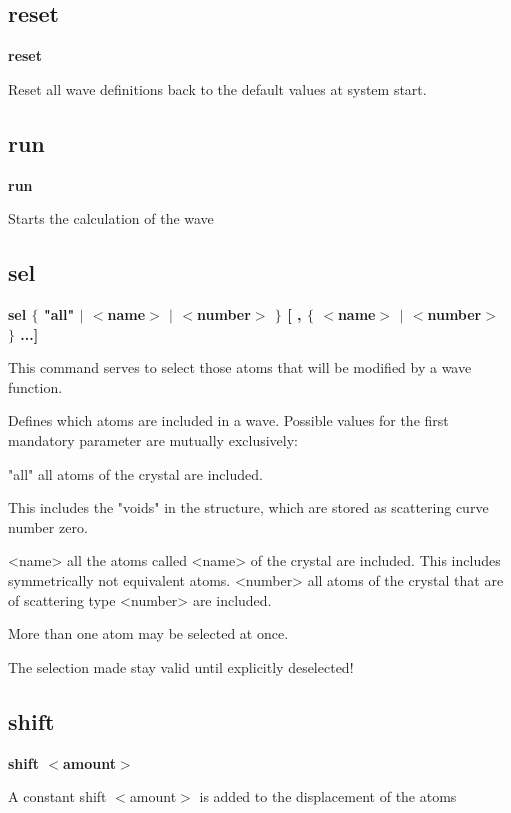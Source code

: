 \subsection*{reset}
{\bf reset \par }
\par
\vspace{3pt}
Reset all wave definitions back to the default values at 
system start. 
\subsection*{run}
{\bf run \par }
\par
\vspace{3pt}
Starts the calculation of the wave 
\subsection*{sel}
{\bf sel $ \{$ "all" $| $ $ <$name$> $ $| $ $ <$number$> $ $\} $ [ , $ \{$ $ <$name$> $ $| $ $ <$number$> $ $\} $ ...] \par }
\par
\vspace{3pt}
This command serves to select 
those atoms that will be modified by a wave function. 
\par
Defines which atoms are included in a wave. Possible values 
for the first mandatory parameter are mutually exclusively: 
\par
\begin{MacVerbatim}
"all"     all atoms of the crystal are included.
\end{MacVerbatim}
          This includes the "voids" in the structure, which are stored 
          as scattering curve number zero. 
\begin{MacVerbatim}
<name>    all the atoms called <name> of the crystal are included.
          This includes symmetrically not equivalent atoms.
<number>  all atoms of the crystal that are of scattering type <number>
          are included.
\end{MacVerbatim}
More than one atom may be selected at once. 
\par
The selection made stay valid until explicitly deselected! 
\subsection*{shift}
{\bf shift $ <$amount$> $ \par }
\par
\vspace{3pt}
A constant shift $ <$amount$> $ is added to the displacement of the atoms 
